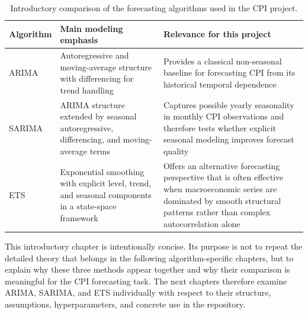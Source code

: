 \begin{table}[htbp]
    \centering
    \caption{Introductory comparison of the forecasting algorithms used in the CPI project.}
    \label{tab:forecasting-algorithm-overview}
    {\small
    \renewcommand{\arraystretch}{1.22}
    \setlength{\tabcolsep}{7pt}
    \begin{tabular}{L{2.7cm}L{4.8cm}L{5.5cm}}
        \hline
        Algorithm & Main modeling emphasis & Relevance for this project \\
        \hline
        ARIMA & Autoregressive and moving-average structure with differencing for trend handling & Provides a classical non-seasonal baseline for forecasting CPI from its historical temporal dependence \\
        SARIMA & ARIMA structure extended by seasonal autoregressive, differencing, and moving-average terms & Captures possible yearly seasonality in monthly CPI observations and therefore tests whether explicit seasonal modeling improves forecast quality \\
        ETS & Exponential smoothing with explicit level, trend, and seasonal components in a state-space framework & Offers an alternative forecasting perspective that is often effective when macroeconomic series are dominated by smooth structural patterns rather than complex autocorrelation alone \\
        \hline
    \end{tabular}
    }
\end{table}

This introductory chapter is intentionally concise. Its purpose is not to repeat the detailed theory that belongs in the following algorithm-specific chapters, but to explain why these three methods appear together and why their comparison is meaningful for the CPI forecasting task. The next chapters therefore examine ARIMA, SARIMA, and ETS individually with respect to their structure, assumptions, hyperparameters, and concrete use in the repository.
